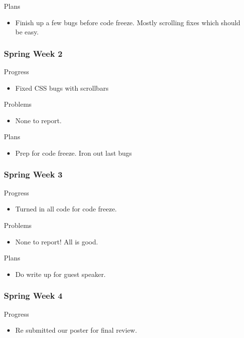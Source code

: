         \noindent
        Plans
        \begin{itemize}
            \item Finish up a few bugs before code freeze. Mostly scrolling fixes which should be easy.
        \end{itemize}
    \subsubsection{Spring Week 2}
        \noindent
        Progress
        \begin{itemize}
            \item Fixed CSS bugs with scrollbars
        \end{itemize}
        
        \noindent
        Problems
        \begin{itemize}
            \item None to report. 
        \end{itemize}
        
        \noindent
        Plans
        \begin{itemize}
            \item Prep for code freeze. Iron out last bugs 
        \end{itemize}
    \subsubsection{Spring Week 3}
        \noindent
        Progress
        \begin{itemize}
            \item Turned in all code for code freeze. 
        \end{itemize}
        
        \noindent
        Problems
        \begin{itemize}
            \item None to report! All is good. 
        \end{itemize}
        
        \noindent
        Plans
        \begin{itemize}
            \item Do write up for guest speaker. 
        \end{itemize}
    \subsubsection{Spring Week 4}
        \noindent
        Progress
        \begin{itemize}
            \item Re submitted our poster for final review. 
        \end{itemize}
        
